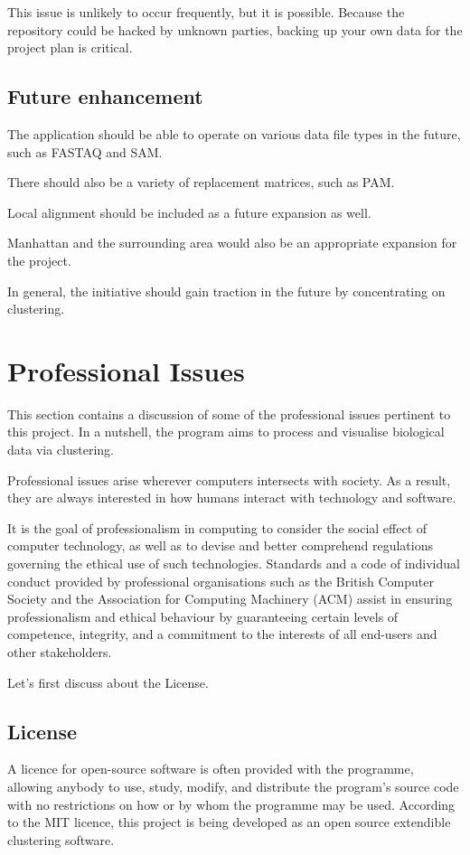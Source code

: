 \documentclass[]{final_report}
\begin{document}
This issue is unlikely to occur frequently, but it is possible. Because the repository could be hacked by unknown parties, backing up your own data for the project plan is critical.
\section{Future enhancement}
The application should be able to operate on various data file types in the future, such as FASTAQ and SAM.

There should also be a variety of replacement matrices, such as PAM.

Local alignment should be included as a future expansion as well.

Manhattan and the surrounding area would also be an appropriate expansion for the project.

In general, the initiative should gain traction in the future by concentrating on clustering.

\chapter{Professional Issues}
This section contains a discussion of some of the professional issues pertinent to this project. In a nutshell, the program aims to process and visualise biological data via clustering. 

Professional issues arise wherever computers intersects with society. As a result, they are always interested in how humans interact with technology and software.

It is the goal of professionalism in computing to consider the social effect of computer technology, as well as to devise and better comprehend regulations governing the ethical use of such technologies.
Standards and a code of individual conduct provided by professional organisations such as the British Computer Society and the Association for Computing Machinery (ACM) assist in ensuring professionalism and ethical behaviour by guaranteeing certain levels of competence, integrity, and a commitment to the interests of all end-users and other stakeholders.

Let's first discuss about the License.

\section{License}
A licence for open-source software is often provided with the programme, allowing anybody to use, study, modify, and distribute the program's source code with no restrictions on how or by whom the programme may be used.
According to the MIT licence, this project is being developed as an open source extendible clustering software.
\end{document}
